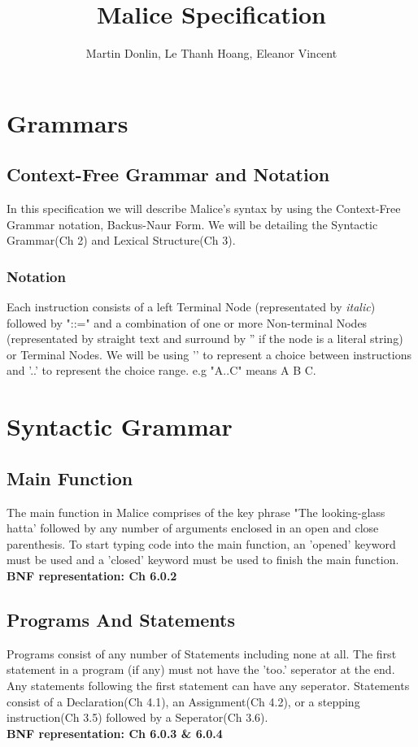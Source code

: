 \documentclass[10pt]{article}
\title{Malice Specification}
\author{Martin Donlin, Le Thanh Hoang, Eleanor Vincent}
\begin{document}
  \maketitle 
  \subsectionfont{\normalsize}
  \sectionfont{\large}
  \subsubsectionfont{\small}
  \section{Grammars}
  \subsection{Context-Free Grammar and Notation}
  \footnotesize In this specification we will describe Malice's syntax by using the Context-Free Grammar notation, Backus-Naur Form. We will be detailing the Syntactic Grammar(Ch 2) and Lexical Structure(Ch 3). 
\subsubsection{Notation}
Each instruction consists of a left Terminal Node (representated by \emph{italic}) followed by "::=" and a combination of one or more Non-terminal Nodes (representated by straight text and surround by '' if the node is a literal string) or Terminal Nodes. We will be using '\textbar' to represent a choice between instructions and '..' to represent the choice range. e.g "A..C" means A \textbar \space B \textbar \space C. 
  \section{Syntactic Grammar}
  \subsection{Main Function}
  The main function in Malice comprises of the key phrase "The looking-glass hatta' followed by any number of arguments enclosed in an open and close parenthesis. To start typing code into the main function, an 'opened' keyword must be used and a 'closed' keyword must be used to finish the main function.
  \\{\bf BNF representation: Ch 6.0.2}
  \subsection{Programs And Statements}
  Programs consist of any number of Statements including none at all. The first statement in a program (if any) must not have the 'too.' seperator at the end. Any statements following the first statement can have any seperator. Statements consist of a Declaration(Ch 4.1), an Assignment(Ch 4.2), or a stepping instruction(Ch 3.5) followed by a Seperator(Ch 3.6).
  \\{\bf BNF representation: Ch 6.0.3 \& 6.0.4}
\end{document}
